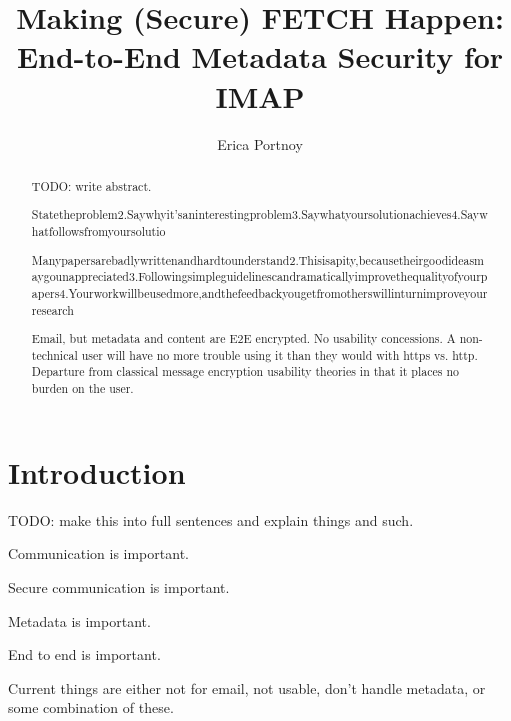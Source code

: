 \documentclass[pageno]{jpaper}
\newcommand{\project}{IMAPSec }
\begin{document}
\title{Making (Secure) FETCH Happen:
\\ \vspace{2 mm} {\large End-to-End Metadata Security for IMAP}}


\author{Erica Portnoy}

\date{}
\maketitle

\thispagestyle{empty}

\tableofcontents

\begin{abstract}
TODO: write abstract.

Statetheproblem2.Saywhyit’saninterestingproblem3.Saywhatyoursolutionachieves4.Saywhatfollowsfromyoursolutio

Manypapersarebadlywrittenandhardtounderstand2.Thisisapity,becausetheirgoodideasmaygounappreciated3.Followingsimpleguidelinescandramaticallyimprovethequalityofyourpapers4.Yourworkwillbeusedmore,andthefeedbackyougetfromotherswillinturnimproveyourresearch


Email, but metadata and content are E2E encrypted. No usability concessions. A non-technical user will have no more trouble using it than they would with https vs. http. Departure from classical message encryption usability theories in that it places no burden on the user.
\end{abstract}

\section{Introduction}

TODO: make this into full sentences and explain things and such.

Communication is important.

Secure communication is important.

Metadata is important.

End to end is important.

Current things are either not for email, not usable, don't handle metadata, or some combination of these.
\end{document}
